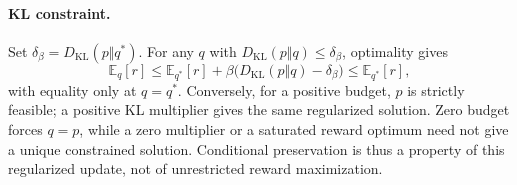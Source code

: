 \paragraph{KL constraint.}
Set $\delta_\beta=D_{\mathrm{KL}}(p\Vert q^*)$.
For any $q$ with $D_{\mathrm{KL}}(p\Vert q)\le\delta_\beta$, optimality gives
\begin{equation}
 \mathbb E_q[r]\le\mathbb E_{q^*}[r]
 +\beta\bigl(D_{\mathrm{KL}}(p\Vert q)-\delta_\beta\bigr)
 \le\mathbb E_{q^*}[r],
 \label{eq:app-reward-constrained}
\end{equation}
with equality only at $q=q^*$. Conversely, for a positive budget,
$p$ is strictly feasible; a positive KL multiplier gives the same
regularized solution. Zero budget forces $q=p$, while a zero multiplier
or a saturated reward optimum need not give a unique constrained solution.
Conditional preservation is thus a property of this regularized update,
not of unrestricted reward maximization.
